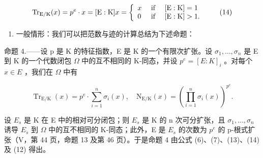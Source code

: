 \[
\operatorname{Tr} _ {\mathrm{E} / \mathrm{K}} (x) = p ^ {e} \cdot x = [ \mathrm{E}: \mathrm{K} ] x = \left\{ \begin{array}{l l} x & \text { if } \quad [ \mathrm{E}: \mathrm{K} ] = 1 \\ 0 & \text { if } \quad [ \mathrm{E}: \mathrm{K} ] > 1. \end{array} \right.\tag{14}
\]

\begin{enumerate}
\def\labelenumi{\alph{enumi})}
\setcounter{enumi}{2}
\tightlist
\item
  一般情形：我们可以把范数与迹的计算总结为下述命题：
\end{enumerate}

命题 4.——设 p 是 K 的特征指数，E 是 K 的一个有限次扩张。设 \(\sigma_{1}, \ldots, \sigma_{n}\) 是 E 到 K 的一个代数闭包 \(\Omega\) 中的互不相同的 K-同态，并设 \(p^{e} = [E : K]_{i}\) 。对每个 \(x \in E\) ，我们在 \(\Omega\) 中有

\[
\operatorname{Tr} _ {\mathrm{E} / \mathrm{K}} (x) = p ^ {e} \cdot \sum_ {i = 1} ^ {n} \sigma_ {i} (x), \quad \mathrm{N} _ {\mathrm{E} / \mathrm{K}} (x) = \left(\prod_ {i = 1} ^ {n} \sigma_ {i} (x)\right) ^ {p ^ {e}}.\tag{15}
\]

设 \(E_s\) 是 K 在 E 中的相对可分闭包；则 \(E_s\) 是 K 的 n 次可分扩张，且 \(\sigma_1, \ldots, \sigma_n\) 诱导 \(E_s\) 到 \(\Omega\) 中的互不相同的 K-同态；此外，E 是 \(E_s\) 的次数为 \(p^e\) 的 p-根式扩张（V，第 44 页，命题 13 及第 46 页）。于是命题 4 由公式 (6)、(7)、(13)、(14) 及 (12) 得出。

